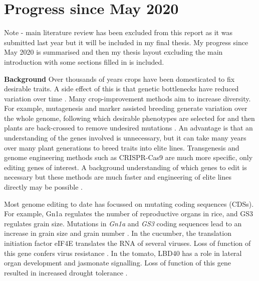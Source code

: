 \documentclass[../main.tex]{subfiles}
\begin{document}
\chapter{Progress since May 2020}\label{progress}
Note - main literature review has been excluded from this report as it was submitted last year but it will be included in my final thesis.
My progress since May 2020 is summarised and then my thesis layout excluding the main introduction with some sections filled in is included.

\textbf{Background}
Over thousands of years crops have been domesticated to fix desirable traits.
A side effect of this is that genetic bottlenecks have reduced variation over time \autocite{tanksleySeedBanksMolecular1997}.
Many crop\hyp{}improvement methods aim to increase diversity.
For example, mutagenesis and marker assisted breeding generate variation over the whole genome, following which desirable phenotypes are selected for and then plants are back\hyp{}crossed to remove undesired mutations \autocite{tuberosaMarkerAssistedbreedingBreedSee2012}.
An advantage is that an understanding of the genes involved is unnecessary, but it can take many years over many plant generations to breed traits into elite lines.
Transgenesis and genome engineering methods such as CRISPR\hyp{}Cas9 are much more specific, only editing genes of interest.
A background understanding of which genes to edit is necessary but these methods are much faster and engineering of elite lines directly may be possible \autocite{sedeekPlantGenomeEngineering2019}.

Most genome editing to date has focussed on mutating coding sequences (CDSs).
For example, Gn1a regulates the number of reproductive organs in rice, and GS3 regulates grain size.
Mutations in \textit{Gn1a} and \textit{GS3} coding sequences lead to an increase in grain size and grain number \autocite{shenQTLEditingConfers2018}.
In the cucumber, the translation initiation factor eIF4E translates the RNA of several viruses.
Loss of function of this gene confers virus resistance \autocite{chandrasekaranDevelopmentBroadVirus2016}.
In the tomato, LBD40 has a role in lateral organ development and jasmonate signalling.
Loss of function of this gene resulted in increased drought tolerance \autocite{liuCRISPRCas9Targeted2020}.
\end{document}
